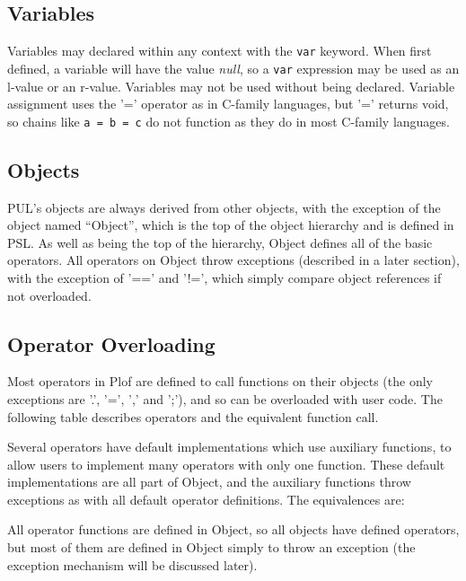 \subsection{Variables}

Variables may declared within any context with the \texttt{var} keyword. When first defined, a variable will have the value \textit{null}, so a \texttt{var} expression may be used as an l-value or an r-value. Variables may not be used without being declared. Variable assignment uses the '=' operator as in C-family languages, but '=' returns void, so chains like \texttt{a = b = c} do not function as they do in most C-family languages.



\subsection{Objects}

PUL's objects are always derived from other objects, with the exception of the object named “Object”, which is the top of the object hierarchy and is defined in PSL. As well as being the top of the hierarchy, Object defines all of the basic operators. All operators on Object throw exceptions (described in a later section), with the exception of '==' and '!=', which simply compare object references if not overloaded.



\subsection{Operator Overloading}

Most operators in Plof are defined to call functions on their objects (the only exceptions are '.', '=', ',' and ';'), and so can be overloaded with user code. The following table describes operators and the equivalent function call.


Several operators have default implementations which use auxiliary functions, to allow users to implement many operators with only one function. These default implementations are all part of Object, and the auxiliary functions throw exceptions as with all default operator definitions. The equivalences are:


All operator functions are defined in Object, so all objects have defined operators, but most of them are defined in Object simply to throw an exception (the exception mechanism will be discussed later).

